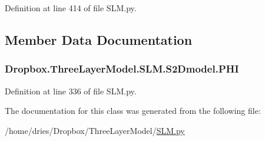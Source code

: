 Definition at line 414 of file S\+L\+M.\+py.



\subsection{Member Data Documentation}
\hypertarget{classDropbox_1_1ThreeLayerModel_1_1SLM_1_1S2Dmodel_a30b802120760fbc176900016c8db7b4d}{
\subsubsection[{P\+H\+I}]{\setlength{\rightskip}{0pt plus 5cm}Dropbox.\+Three\+Layer\+Model.\+S\+L\+M.\+S2\+Dmodel.\+P\+H\+I}}\label{classDropbox_1_1ThreeLayerModel_1_1SLM_1_1S2Dmodel_a30b802120760fbc176900016c8db7b4d}


Definition at line 336 of file S\+L\+M.\+py.



The documentation for this class was generated from the following file\+:\begin{DoxyCompactItemize}
\item 
/home/dries/\+Dropbox/\+Three\+Layer\+Model/\hyperlink{SLM_8py}{S\+L\+M.\+py}\end{DoxyCompactItemize}
